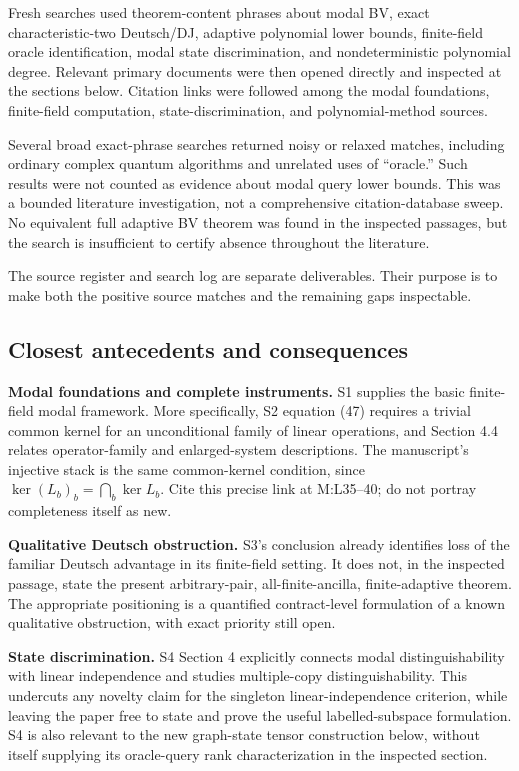 \documentclass[
  11pt,
]{article}
\begin{document}
Fresh searches used theorem-content phrases about modal BV, exact
characteristic-two Deutsch/DJ, adaptive polynomial lower bounds,
finite-field oracle identification, modal state discrimination, and
nondeterministic polynomial degree. Relevant primary documents were then
opened directly and inspected at the sections below. Citation links were
followed among the modal foundations, finite-field computation,
state-discrimination, and polynomial-method sources.

Several broad exact-phrase searches returned noisy or relaxed matches,
including ordinary complex quantum algorithms and unrelated uses of
``oracle.'' Such results were not counted as evidence about modal query
lower bounds. This was a bounded literature investigation, not a
comprehensive citation-database sweep. No equivalent full adaptive BV
theorem was found in the inspected passages, but the search is
insufficient to certify absence throughout the literature.

The source register and search log are separate deliverables. Their
purpose is to make both the positive source matches and the remaining
gaps inspectable.

\subsection{Closest antecedents and
consequences}\label{closest-antecedents-and-consequences}

\textbf{Modal foundations and complete instruments.} S1 supplies the
basic finite-field modal framework. More specifically, S2 equation (47)
requires a trivial common kernel for an unconditional family of linear
operations, and Section 4.4 relates operator-family and enlarged-system
descriptions. The manuscript's injective stack is the same common-kernel
condition, since \(\ker(L_b)_b=\bigcap_b\ker L_b\). Cite this precise
link at M:L35--40; do not portray completeness itself as new.

\textbf{Qualitative Deutsch obstruction.} S3's conclusion already
identifies loss of the familiar Deutsch advantage in its finite-field
setting. It does not, in the inspected passage, state the present
arbitrary-pair, all-finite-ancilla, finite-adaptive theorem. The
appropriate positioning is a quantified contract-level formulation of a
known qualitative obstruction, with exact priority still open.

\textbf{State discrimination.} S4 Section 4 explicitly connects modal
distinguishability with linear independence and studies multiple-copy
distinguishability. This undercuts any novelty claim for the singleton
linear-independence criterion, while leaving the paper free to state and
prove the useful labelled-subspace formulation. S4 is also relevant to
the new graph-state tensor construction below, without itself supplying
its oracle-query rank characterization in the inspected section.
\end{document}
